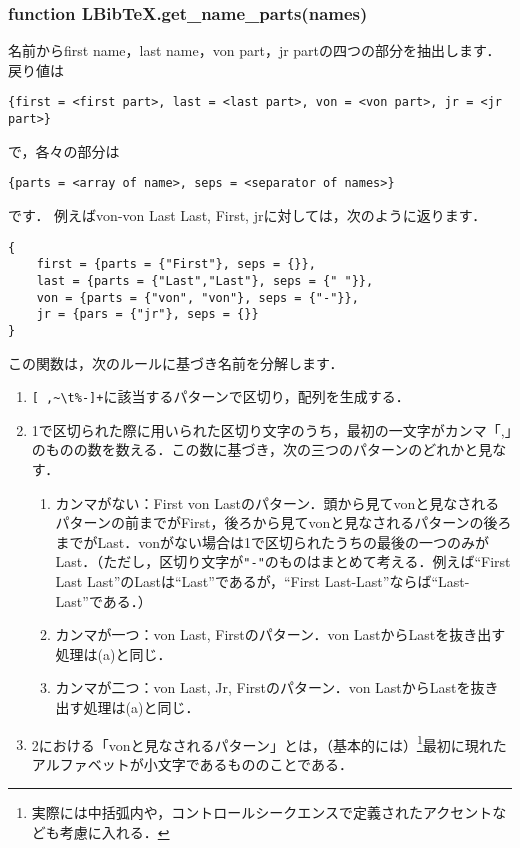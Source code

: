 \documentclass[dvipdfmx,a4paper]{jsarticle}
\begin{document}
\subsubsection{function LBibTeX.get\_name\_parts(names)}
名前からfirst name，last name，von part，jr partの四つの部分を抽出します．
戻り値は
\begin{lstlisting}
{first = <first part>, last = <last part>, von = <von part>, jr = <jr part>}
\end{lstlisting}
で，各々の部分は
\begin{lstlisting}
{parts = <array of name>, seps = <separator of names>}
\end{lstlisting}
です．%
例えばvon-von Last Last, First, jrに対しては，次のように返ります．
\begin{lstlisting}
{
	first = {parts = {"First"}, seps = {}},
	last = {parts = {"Last","Last"}, seps = {" "}},
	von = {parts = {"von", "von"}, seps = {"-"}},
	jr = {pars = {"jr"}, seps = {}}
}
\end{lstlisting}

この関数は，次のルールに基づき名前を分解します．
\begin{enumerate}
\item \verb|[ ,~\t%-]+|に該当するパターンで区切り，配列を生成する．
\item 1で区切られた際に用いられた区切り文字のうち，最初の一文字がカンマ「,」のものの数を数える．この数に基づき，次の三つのパターンのどれかと見なす．
\begin{enumerate}
\item カンマがない：First von Lastのパターン．頭から見てvonと見なされるパターンの前までがFirst，後ろから見てvonと見なされるパターンの後ろまでがLast．vonがない場合は1で区切られたうちの最後の一つのみがLast．（ただし，区切り文字が\verb|"-"|のものはまとめて考える．例えば``First Last Last''のLastは``Last''であるが，``First Last-Last''ならば``Last-Last''である．）
\item カンマが一つ：von Last, Firstのパターン．von LastからLastを抜き出す処理は(a)と同じ．
\item カンマが二つ：von Last, Jr, Firstのパターン．von LastからLastを抜き出す処理は(a)と同じ．
\end{enumerate}
\item 2における「vonと見なされるパターン」とは，（基本的には）\footnote{実際には中括弧内や，コントロールシークエンスで定義されたアクセントなども考慮に入れる．}最初に現れたアルファベットが小文字であるもののことである．
\end{enumerate}
\end{document}
